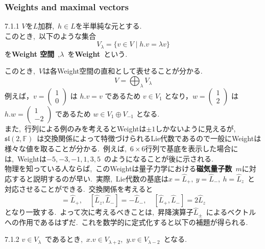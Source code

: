 \documentclass[uplatex,dvipdfmx]{jsarticle}
\begin{document}
\subsubsection{Weights and maximal vectors}
\begin{mydef}{7.1.1}
    $V$を$L$加群,~$h\in L $を半単純な元とする.\\
    このとき,~以下のような集合
    \begin{equation*}
        V_\lambda = \{ v \in V \mid h.v = \lambda v \}
    \end{equation*}
    を\textbf{Weight 空間}~,$\lambda$~を\textbf{Weight}~という.\\
\end{mydef}
このとき,~$V$は各Weight空間の直和として表せることが分かる.
\begin{equation*}
    V = \bigoplus_{\lambda} V_\lambda
\end{equation*}
例えば，$v = \left( \begin{smallmatrix} 1 \\ 0 \end{smallmatrix} \right)$ は $h.v = v$ であるため $v \in V_1$ となり，$w = \left( \begin{smallmatrix} 1 \\ 2 \end{smallmatrix} \right)$ は $h.w = \left( \begin{smallmatrix} 1 \\ -2 \end{smallmatrix} \right)$ であるため $w \in V_1 \oplus V_{-1}$ となる.\\
また,~行列による例のみを考えるとWeightは$\pm 1$しかないように見えるが,~$\mathfrak{sl} (2,\mathbb{F})$~は交換関係によって特徴づけられるLie代数であるので一般にWeightは様々な値を取ることが分かる.~例えば,~$6\times 6$行列で基底を表示した場合には,~Weightは$-5,-3,-1,1,3,5$~のようになることが後に示される.\\
物理を知っている人ならば,~このWeightは量子力学における\textbf{磁気量子数}~$m$に対応すると説明するのが早い.~実際,~Lie代数の基底は$x = \hat{L}_+,~y = \hat{L}_-,~h = \hat{L}_z$~と対応させることができる.~交換関係を考えると
\begin{equation*}
    [\hat{L}_z, \hat{L}_+] = \hat{L}_+, \quad
    [\hat{L}_z, \hat{L}_-] = -\hat{L}_-, \quad
    [\hat{L}_+, \hat{L}_-] = 2\hat{L}_z
\end{equation*}
となり一致する.~よって次に考えるべきことは,~昇降演算子$\hat{L}_\pm$~によるベクトルへの作用であるはずだ.~これを数学的に定式化すると以下の補題が得られる.
\begin{mylemma}{7.1.2}
    $v\in V_\lambda$~であるとき,~$x.v \in V_{\lambda + 2}$,~$y.v \in V_{\lambda - 2}$~となる.
\end{mylemma}
\end{document}
